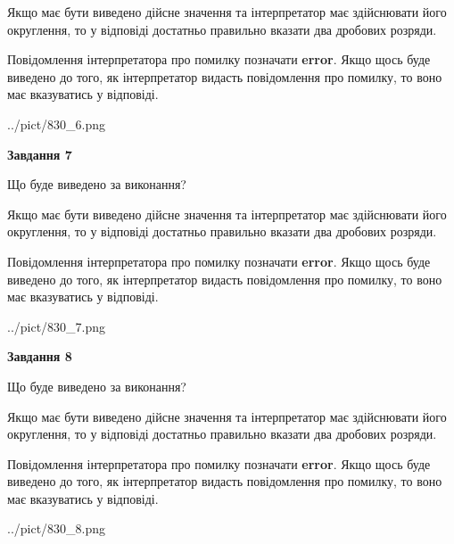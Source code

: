 \documentclass[12pt, ukrainian]{article}
\begin{document}
{\begin {Large}
Якщо має бути виведено дійсне значення та інтерпретатор має здійснювати його округлення, 
то у відповіді достатньо правильно вказати два дробових розряди.

Повідомлення інтерпретатора про помилку позначати \textbf{error}.
Якщо щось буде виведено до того, як інтерпретатор видасть повідомлення про помилку, 
то воно має вказуватись у відповіді. \par

\begin{center}
	{../pict/830_6.png}
\end{center}
\newpage

{\begin {center}\textbf{Завдання 7}\end {center}}\par
Що буде виведено за виконання? \par

Якщо має бути виведено дійсне значення та інтерпретатор має здійснювати його округлення, 
то у відповіді достатньо правильно вказати два дробових розряди.

Повідомлення інтерпретатора про помилку позначати \textbf{error}.
Якщо щось буде виведено до того, як інтерпретатор видасть повідомлення про помилку, 
то воно має вказуватись у відповіді. \par

\begin{center}
	{../pict/830_7.png}
\end{center}
\newpage

{\begin {center}\textbf{Завдання 8}\end {center}}\par
Що буде виведено за виконання? \par

Якщо має бути виведено дійсне значення та інтерпретатор має здійснювати його округлення, 
то у відповіді достатньо правильно вказати два дробових розряди.

Повідомлення інтерпретатора про помилку позначати \textbf{error}.
Якщо щось буде виведено до того, як інтерпретатор видасть повідомлення про помилку, 
то воно має вказуватись у відповіді. \par

\begin{center}
	{../pict/830_8.png}
\end{center}
\newpage


\end{Large}}
\end{document}
